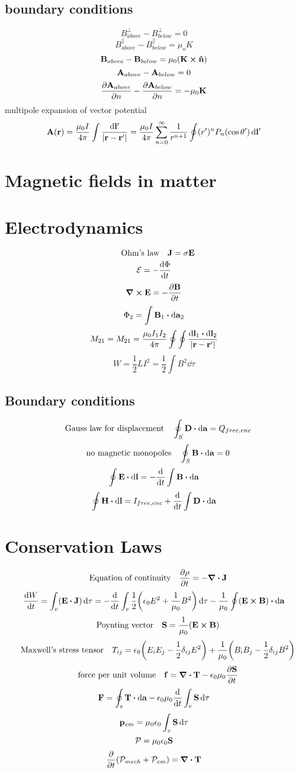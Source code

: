 \documentclass[12pt]{article}
\begin{document}
\subsection*{boundary conditions}
\[B^{\perp}_{above}-B^{\perp}_{below}=0\]
\[B^{\parallel}_{above}-B^{\parallel}_{below}=\mu_oK\]
\[\vb{B}_{above}-\vb{B}_{below}=\mu_0(\vb{K}\cp\vu{n})\]
\[\vb{A}_{above}-\vb{A}_{below}=0\]
\[\pdv{\vb{A}_{above}}{n}-\pdv{\vb{A}_{below}}{n}=-\mu_0\vb{K}\]
multipole expansion of vector potential\[\vb{A(\vb{r})}=\frac{\mu_0I}{4\pi}\int\frac{\dd{\vb{l}'}}{|\vb{r}-\vb{r'}|}=\frac{\mu_0I}{4\pi}\sum_{n=0}^{\infty}\frac{1}{r^{n+1}}\oint(r')^nP_n(\cos\theta')\dd{\vb{l'}}\]
\section{Magnetic fields in matter}
\section{Electrodynamics}
\[\qq{Ohm's law} \vb{J}=\sigma\vb{E}\]
\[\mathcal{E}=-\dv{\Phi}{t}\]
\[\curl{\vb{E}}=-\pdv{\vb{B}}{t}\]
\[\Phi_2=\int\vb{B}_1\vdot\dd{\vb{a}_2}\]
\[M_{21}=M_{21}=\frac{\mu_0I_1I_2}{4\pi}\oint\oint\frac{\dd{\vb{l}_1}\vdot\dd{\vb{l}_2}}{|\vb{r}-\vb{r}' |}\]
\[W=\frac{1}{2}LI^2=\frac{1}{2}\int B^2\dd{\tau}\]
\subsection{Boundary conditions}
\[\qq{Gauss law for displacement}\oint_{S}\vb{D}\vdot\dd{\vb{a}}=Q_{free,enc}\]
\[\qq{no magnetic monopoles}\oint_{S}\vb{B}\vdot\dd{\vb{a}}=0\]
\[\oint\vb{E}\vdot\dd{\vb{l}}=-\dv{t}\int\vb{B}\vdot\dd{\vb{a}}\]
\[\oint\vb{H}\vdot\dd{\vb{l}}=I_{free,enc}+\dv{t}\int\vb{D}\vdot\dd{\vb{a}}\]

\section{Conservation Laws}
\[\qq{Equation of continuity} \pdv{\rho}{t}=-\div{\vb{J}}\]
\[\dv{W}{t}=\int_{v}(\vb{E}\vdot{\vb{J}})\dd{\tau}=-\dv{t}\int_{v}\frac{1}{2}\qty(\epsilon_0E^2+\frac{1}{\mu_0}B^2)\dd{\tau}-\frac{1}{\mu_0}\oint(\vb{E}\cp\vb{B})\vdot\dd{\vb{a}}\]
\[\qq{Poynting vector}\vb{S}=\frac{1}{\mu_0}(\vb{E}\cp\vb{B})\]
\[\qq{Maxwell's stress tensor} T_{ij}=\epsilon_0\qty(E_iE_j-\frac{1}{2}\delta_{ij}E^2)+\frac{1}{\mu_0}\qty(B_iB_j-\frac{1}{2}\delta_{ij}B^2)\]
\[\qq{force per unit volume} \vb{f}=\div{\vb{T}}-\epsilon_0\mu_0\pdv{\vb{S}}{t}\]
\[\vb{F}=\oint_s\vb{T}\vdot\dd{\vb{a}}-\epsilon_0\mu_0\dv{t}\int_v\vb{S}\dd{\tau}\]
\[\vb{p}_{em}=\mu_0\epsilon_0\int_v\vb{S}\dd{\tau}\]
\[\mathcal{P}=\mu_0\epsilon_0\vb{S}\]
\[\pdv{t}(\mathcal{P}_{mech}+\mathcal{P}_{em})=\div{\vb{T}}\]
\end{document}
